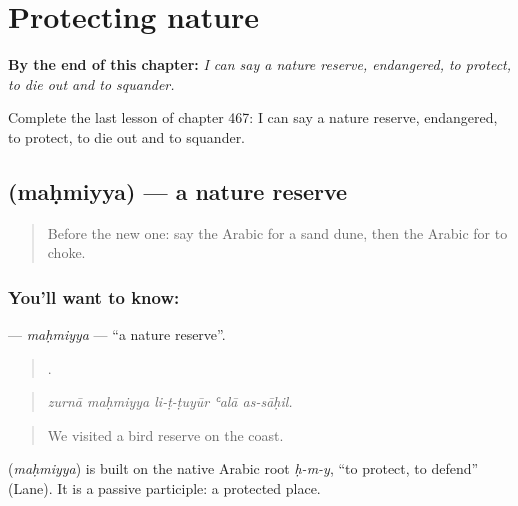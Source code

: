 
\chapter{Protecting nature}
\label{ch:ar-protecting-nature}

\begin{chapteropening}
\textbf{By the end of this chapter:} \emph{I can say a nature reserve, endangered, to protect, to die out and to squander.}

Complete the last lesson of chapter 467: I can say a nature reserve, endangered, to protect, to die out and to squander.
\end{chapteropening}

\section[\texorpdfstring{\ar{محمية} (maḥmiyya)}{محمية (maḥmiyya)}]{ (maḥmiyya) — a nature reserve}

\label{lesson:AR-C467-mahmiyya}



\begin{quote}
Before the new one: say the Arabic for a sand dune, then the Arabic for to choke.
\end{quote}

\subsection*{You'll want to know: }
\textbf{} — \emph{maḥmiyya} — \textquotedblleft{}a nature reserve\textquotedblright{}.

\begin{quote}
    .
\end{quote}

\begin{quote}
\emph{zurnā maḥmiyya li-ṭ-ṭuyūr ʿalā as-sāḥil.}
\end{quote}

\begin{quote}
We visited a bird reserve on the coast.
\end{quote}

\begin{cousinweb}
\textbf{} (\emph{maḥmiyya}) is built on the native Arabic root \emph{ḥ-m-y}, \textquotedblleft{}to protect, to defend\textquotedblright{} (Lane). It is a passive participle: a protected place.
\end{cousinweb}

